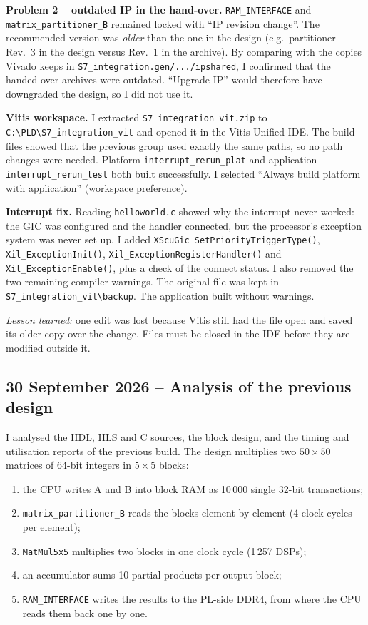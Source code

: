 \documentclass[11pt,a4paper]{article}
\newcommand{\code}[1]{\texttt{#1}}
\begin{document}
\textbf{Problem 2 -- outdated IP in the hand-over.} \code{RAM\_INTERFACE} and \code{matrix\_partitioner\_B} remained locked with ``IP revision change''. The recommended version was \emph{older} than the one in the design (e.g.\ partitioner Rev.~3 in the design versus Rev.~1 in the archive). By comparing with the copies Vivado keeps in \code{S7\_integration.gen/.../ipshared}, I confirmed that the handed-over archives were outdated. ``Upgrade IP'' would therefore have downgraded the design, so I did not use it.

\textbf{Vitis workspace.} I extracted \code{S7\_integration\_vit.zip} to \code{C:\textbackslash PLD\textbackslash S7\_integration\_vit} and opened it in the Vitis Unified IDE. The build files showed that the previous group used exactly the same paths, so no path changes were needed. Platform \code{interrupt\_rerun\_plat} and application \code{interrupt\_rerun\_test} both built successfully. I selected ``Always build platform with application'' (workspace preference).

\textbf{Interrupt fix.} Reading \code{helloworld.c} showed why the interrupt never worked: the GIC was configured and the handler connected, but the processor's exception system was never set up. I added \code{XScuGic\_SetPriorityTriggerType()}, \code{Xil\_ExceptionInit()}, \code{Xil\_ExceptionRegisterHandler()} and \code{Xil\_ExceptionEnable()}, plus a check of the connect status. I also removed the two remaining compiler warnings. The original file was kept in \code{S7\_integration\_vit\textbackslash backup}. The application built without warnings.

\textit{Lesson learned:} one edit was lost because Vitis still had the file open and saved its older copy over the change. Files must be closed in the IDE before they are modified outside it.

\subsection{30 September 2026 -- Analysis of the previous design}
I analysed the HDL, HLS and C sources, the block design, and the timing and utilisation reports of the previous build. The design multiplies two $50\times50$ matrices of 64-bit integers in $5\times5$ blocks:
\begin{enumerate}[noitemsep]
  \item the CPU writes A and B into block RAM as 10\,000 single 32-bit transactions;
  \item \code{matrix\_partitioner\_B} reads the blocks element by element (4 clock cycles per element);
  \item \code{MatMul5x5} multiplies two blocks in one clock cycle (1\,257 DSPs);
  \item an accumulator sums 10 partial products per output block;
  \item \code{RAM\_INTERFACE} writes the results to the PL-side DDR4, from where the CPU reads them back one by one.
\end{enumerate}
\end{document}

